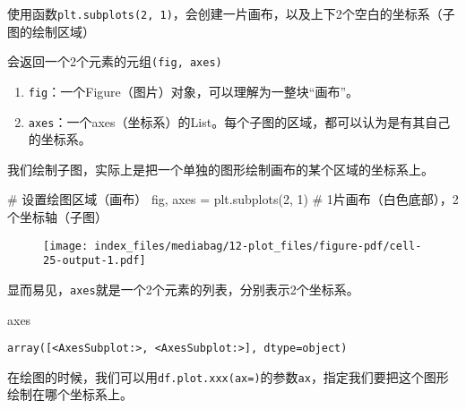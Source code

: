 \documentclass[
  letterpaper,
  DIV=11,
  numbers=noendperiod]{scrreprt}
\newenvironment{Shaded}{\begin{snugshade}}{\end{snugshade}}
\newcommand{\CommentTok}[1]{\textcolor[rgb]{0.37,0.37,0.37}{#1}}
\newcommand{\DecValTok}[1]{\textcolor[rgb]{0.68,0.00,0.00}{#1}}
\newcommand{\NormalTok}[1]{\textcolor[rgb]{0.00,0.23,0.31}{#1}}
\newcommand{\OperatorTok}[1]{\textcolor[rgb]{0.37,0.37,0.37}{#1}}
\providecommand{\tightlist}{%
  \setlength{\itemsep}{0pt}\setlength{\parskip}{0pt}}\usepackage{longtable,booktabs,array}
\begin{document}
使用函数\texttt{plt.subplots(2,\ 1)}，会创建一片画布，以及上下2个空白的坐标系（子图的绘制区域）

会返回一个2个元素的元组\texttt{(fig,\ axes)}

\begin{enumerate}
\def\labelenumi{\arabic{enumi}.}
\tightlist
\item
  \texttt{fig}：一个Figure（图片）对象，可以理解为一整块``画布''。
\item
  \texttt{axes}：一个axes（坐标系）的List。每个子图的区域，都可以认为是有其自己的坐标系。
\end{enumerate}

我们绘制子图，实际上是把一个单独的图形绘制画布的某个区域的坐标系上。

\begin{Shaded}
\begin{Highlighting}[]
\CommentTok{\# 设置绘图区域（画布）}
\NormalTok{fig, axes }\OperatorTok{=}\NormalTok{ plt.subplots(}\DecValTok{2}\NormalTok{, }\DecValTok{1}\NormalTok{) }\CommentTok{\# 1片画布（白色底部），2个坐标轴（子图）}
\end{Highlighting}
\end{Shaded}

\begin{figure}[H]

{\centering \texttt{[image: index\_files/mediabag/12-plot\_files/figure-pdf/cell-25-output-1.pdf]}

}

\end{figure}

显而易见，\texttt{axes}就是一个2个元素的列表，分别表示2个坐标系。

\begin{Shaded}
\begin{Highlighting}[]
\NormalTok{axes}
\end{Highlighting}
\end{Shaded}

\begin{verbatim}
array([<AxesSubplot:>, <AxesSubplot:>], dtype=object)
\end{verbatim}

在绘图的时候，我们可以用\texttt{df.plot.xxx(ax=)}的参数\texttt{ax}，指定我们要把这个图形绘制在哪个坐标系上。
\end{document}
